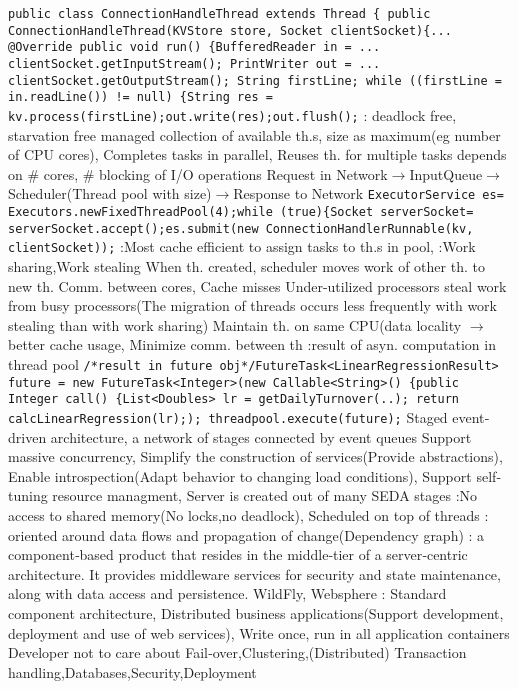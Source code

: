\btext{+}
\lstinline{public class ConnectionHandleThread extends Thread { public ConnectionHandleThread(KVStore store, Socket clientSocket){... @Override public void run() {BufferedReader in = ... clientSocket.getInputStream(); PrintWriter out = ... clientSocket.getOutputStream(); String firstLine; while ((firstLine = in.readLine()) != null) {String res = kv.process(firstLine);out.write(res);out.flush();}
\textbar
{}: deadlock free, starvation free
\textbar
{}managed collection of available th.s,
size as maximum(eg number of CPU cores),
Completes tasks in parallel,
Reuses th. for multiple tasks
 depends on \# cores, \# blocking of I/O operations
\textbar
Request in Network$\rightarrow$InputQueue$\rightarrow$Scheduler(Thread pool with size)$\rightarrow$Response to Network
\lstinline{ExecutorService es= Executors.newFixedThreadPool(4);while (true){Socket serverSocket= serverSocket.accept();es.submit(new ConnectionHandlerRunnable(kv, clientSocket));}
\textbar
{}:Most cache efficient to assign tasks to th.s in pool, :Work sharing,Work stealing
When th. created, scheduler moves work of other th. to new th.
\btext{--:}Comm. between cores, Cache misses
\textbar
{}
Under-utilized processors steal work from busy processors(The migration of threads occurs less frequently with work stealing than with work sharing)
\redtext{++:}Maintain th. on same CPU(data locality $\rightarrow$ better cache usage, Minimize comm. between th
\textbar
{}:result of asyn. computation in thread pool
\lstinline{/*result in future obj*/FutureTask<LinearRegressionResult> future = new FutureTask<Integer>(new Callable<String>() {public Integer call() {List<Doubles> lr = getDailyTurnover(..); return calcLinearRegression(lr);); threadpool.execute(future);}
\textbar
{}Staged event‐driven architecture, a network of stages connected by event queues
\btext{++:}
Support massive concurrency,
Simplify the construction of services(Provide abstractions),
Enable introspection(Adapt behavior to changing load conditions),
Support self‐tuning resource managment,
Server is created out of many SEDA stages
\textbar
{}:No access to shared memory(No locks,no deadlock), Scheduled on top of threads
\textbar
{}: oriented around data flows and propagation of change(Dependency graph)
\textbar \textbar \textbar
{}:  a component‐based product that resides in the middle‐tier of a server‐centric architecture.
It provides middleware services for security and state maintenance, along with data access and persistence.
WildFly, Websphere
\textbar
{}:
Standard component architecture,
Distributed business applications(Support development, deployment and use of web services),
Write once, run in all application containers
\btext{++:}Developer not to care about Fail‐over,Clustering,(Distributed) Transaction handling,Databases,Security,Deployment